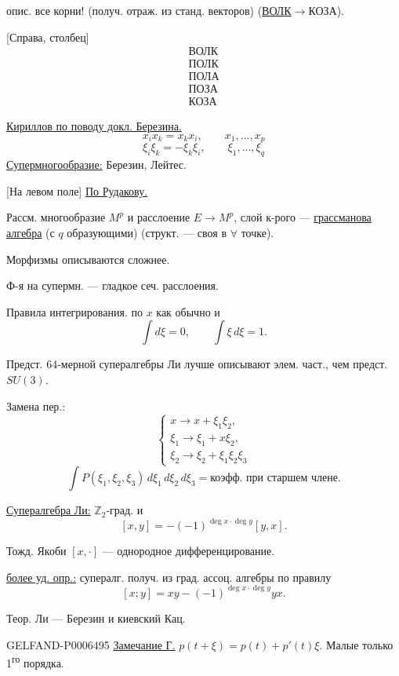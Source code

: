 опис. все корни! (получ. отраж. из станд. векторов) (\underline{ВОЛК}\(\to\)КОЗА).

[Справа, столбец]
\begin{gather*}
\text{ВОЛК}\\
\text{ПОЛК}\\
\text{ПОЛА}\\
\text{ПОЗА}\\
\text{КОЗА}
\end{gather*}

\begin{center}\textemdash\enspace\textperiodcentered\enspace\textemdash\end{center}

\underline{Кириллов по поводу докл. Березина.}
\[
x_i x_k=x_k x_i,\qquad x_1,\ldots,x_p
\]
\[
\xi_i\xi_k=-\xi_k\xi_i,\qquad \xi_1,\ldots,\xi_q
\]
\underline{Супермногообразие:} Березин, Лейтес.

[На левом поле] \underline{По Рудакову.}

Рассм. многообразие \(M^p\) и расслоение \(E\to M^p\), слой к-рого ---
\underline{грассманова алгебра} (с \(q\) образующими)
(структ. --- своя в \(\forall\) точке).

Морфизмы описываются сложнее.

Ф-я на супермн. --- гладкое сеч. расслоения.

Правила интегрирования. по \(x\) как обычно и
\[
\int d\xi=0,\qquad \int\xi\,d\xi=1.
\]

Предст. 64-мерной супералгебры Ли лучше описывают элем. част., чем предст. \(SU(3)\).

Замена пер.:
\[
\begin{cases}
x\to x+\xi_1\xi_2,\\
\xi_1\to\xi_1+x\xi_2,\\
\xi_2\to\xi_2+\xi_1\xi_2\xi_3
\end{cases}
\]
\[
\int P(\xi_1,\xi_2,\xi_3)\,d\xi_1\,d\xi_2\,d\xi_3
=\text{коэфф. при старшем члене.}
\]

\underline{Супералгебра Ли:} \(\mathbb Z_2\)-град. и
\[
[x,y]=-(-1)^{\deg x\cdot\deg y}[y,x].
\]

Тожд. Якоби \([x,\cdot]\) --- однородное дифференцирование.

\underline{более уд. опр.:} супералг. получ. из град. ассоц. алгебры по правилу
\[
[x;y]=xy-(-1)^{\deg x\cdot\deg y}yx.
\]

Теор. Ли --- Березин и киевский Кац.

\begin{GelfandAdjacentEvidence}{GELFAND-P000649}{5}
\underline{Замечание Г.} \(p(t+\xi)=p(t)+p'(t)\xi\). Малые только 1\textsuperscript{го} порядка.
\end{GelfandAdjacentEvidence}




